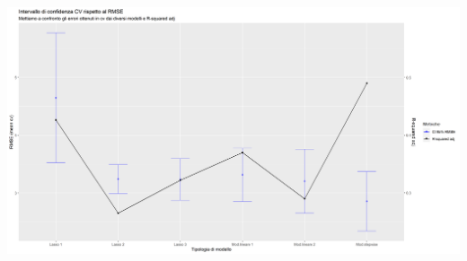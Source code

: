 \begin{Figure}
    \centering
    \includegraphics[width=17cm,keepaspectratio]{images/confronto_tutti_i_modelli.png}
  \end{Figure}

